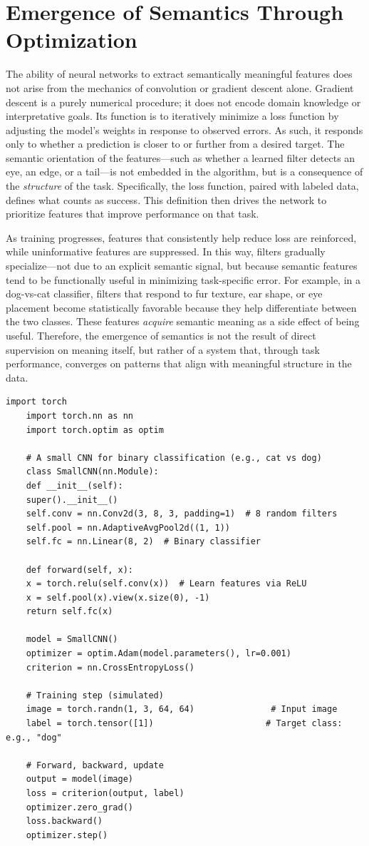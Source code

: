\section{Emergence of Semantics Through Optimization}

The ability of neural networks to extract semantically meaningful features does not arise from the mechanics of convolution or gradient descent alone. Gradient descent is a purely numerical procedure; it does not encode domain knowledge or interpretative goals. Its function is to iteratively minimize a loss function by adjusting the model's weights in response to observed errors. As such, it responds only to whether a prediction is closer to or further from a desired target. The semantic orientation of the features—such as whether a learned filter detects an eye, an edge, or a tail—is not embedded in the algorithm, but is a consequence of the \emph{structure} of the task. Specifically, the loss function, paired with labeled data, defines what counts as success. This definition then drives the network to prioritize features that improve performance on that task.

As training progresses, features that consistently help reduce loss are reinforced, while uninformative features are suppressed. In this way, filters gradually specialize—not due to an explicit semantic signal, but because semantic features tend to be functionally useful in minimizing task-specific error. For example, in a dog-vs-cat classifier, filters that respond to fur texture, ear shape, or eye placement become statistically favorable because they help differentiate between the two classes. These features \emph{acquire} semantic meaning as a side effect of being useful. Therefore, the emergence of semantics is not the result of direct supervision on meaning itself, but rather of a system that, through task performance, converges on patterns that align with meaningful structure in the data.

\begin{lstlisting}[caption=Semantics emerge from loss-driven adaptation rather than explicit supervision]
	import torch
	import torch.nn as nn
	import torch.optim as optim
	
	# A small CNN for binary classification (e.g., cat vs dog)
	class SmallCNN(nn.Module):
	def __init__(self):
	super().__init__()
	self.conv = nn.Conv2d(3, 8, 3, padding=1)  # 8 random filters
	self.pool = nn.AdaptiveAvgPool2d((1, 1))
	self.fc = nn.Linear(8, 2)  # Binary classifier
	
	def forward(self, x):
	x = torch.relu(self.conv(x))  # Learn features via ReLU
	x = self.pool(x).view(x.size(0), -1)
	return self.fc(x)
	
	model = SmallCNN()
	optimizer = optim.Adam(model.parameters(), lr=0.001)
	criterion = nn.CrossEntropyLoss()
	
	# Training step (simulated)
	image = torch.randn(1, 3, 64, 64)               # Input image
	label = torch.tensor([1])                      # Target class: e.g., "dog"
	
	# Forward, backward, update
	output = model(image)
	loss = criterion(output, label)
	optimizer.zero_grad()
	loss.backward()
	optimizer.step()
\end{lstlisting}


